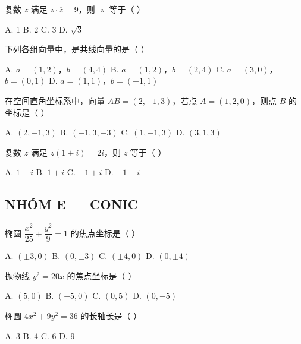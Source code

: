 \documentclass[11pt, a4paper]{article}
\begin{document}
\begin{baitap}[16]
复数 $z$ 满足 $z\cdot\overline{z}=9$，则 $\lvert z\rvert$ 等于（ ）
\par\vspace{3pt}
\noindent A. 1 \quad B. 2 \quad C. 3 \quad D. $\sqrt{3}$
\end{baitap}

\begin{baitap}[17]
下列各组向量中，是共线向量的是（ ）
\par\vspace{3pt}
\noindent A. $a=(1,2)$，$b=(4,4)$ \quad B. $a=(1,2)$，$b=(2,4)$ \quad C. $a=(3,0)$，$b=(0,1)$ \quad D. $a=(1,1)$，$b=(-1,1)$
\end{baitap}

\begin{baitap}[18]
在空间直角坐标系中，向量 $AB=(2,-1,3)$，若点 $A=(1,2,0)$，则点 $B$ 的坐标是（ ）
\par\vspace{3pt}
\noindent A. $(2,-1,3)$ \quad B. $(-1,3,-3)$ \quad C. $(1,-1,3)$ \quad D. $(3,1,3)$
\end{baitap}

\begin{baitap}[19]
复数 $z$ 满足 $z(1+i)=2i$，则 $z$ 等于（ ）
\par\vspace{3pt}
\noindent A. $1-i$ \quad B. $1+i$ \quad C. $-1+i$ \quad D. $-1-i$
\end{baitap}

\subsection*{NHÓM E — CONIC}

\begin{baitap}[20]
椭圆 $\dfrac{x^2}{25}+\dfrac{y^2}{9}=1$ 的焦点坐标是（ ）
\par\vspace{3pt}
\noindent A. $(\pm 3,0)$ \quad B. $(0,\pm 3)$ \quad C. $(\pm 4,0)$ \quad D. $(0,\pm 4)$
\end{baitap}

\begin{baitap}[21]
抛物线 $y^2=20x$ 的焦点坐标是（ ）
\par\vspace{3pt}
\noindent A. $(5,0)$ \quad B. $(-5,0)$ \quad C. $(0,5)$ \quad D. $(0,-5)$
\end{baitap}

\begin{baitap}[22]
椭圆 $4x^2+9y^2=36$ 的长轴长是（ ）
\par\vspace{3pt}
\noindent A. 3 \quad B. 4 \quad C. 6 \quad D. 9
\end{baitap}
\end{document}
